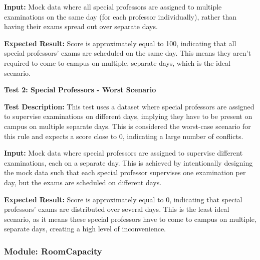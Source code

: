 \vspace{\baselineskip}


 \textbf{Input:}
Mock data where all special professors are assigned to multiple examinations on the same
day (for each professor individually), rather than having their exams spread out over separate
days.

\vspace{\baselineskip}

 
 \textbf{Expected Result:}
Score is approximately equal to 100, indicating that all special professors'
exams are scheduled on the same day. This means they aren't required to come to campus on
multiple, separate days, which is the ideal scenario.


\vspace{\baselineskip}

 
 \textbf{Test 2: Special Professors - Worst Scenario}


\vspace{\baselineskip}

 
 \textbf{Test Description:}
This test uses a dataset where special professors are assigned to supervise
examinations on different days, implying they have to be present on campus on multiple separate
days. This is considered the worst-case scenario for this rule and expects a score close to 0,
indicating a large number of conflicts.

\vspace{\baselineskip}


 \textbf{Input:}
Mock data where special professors are assigned to supervise different examinations, each
on a separate day. This is achieved by intentionally designing the mock data such that each
special professor supervises one examination per day, but the exams are scheduled on different
days.
 
\vspace{\baselineskip}

 
 \textbf{Expected Result:}
Score is approximately equal to 0, indicating that special professors' exams are
distributed over several days. This is the least ideal scenario, as it means these special professors
have to come to campus on multiple, separate days, creating a high level of inconvenience.

\vspace{\baselineskip}




 \subsubsection{Module: RoomCapacity}

